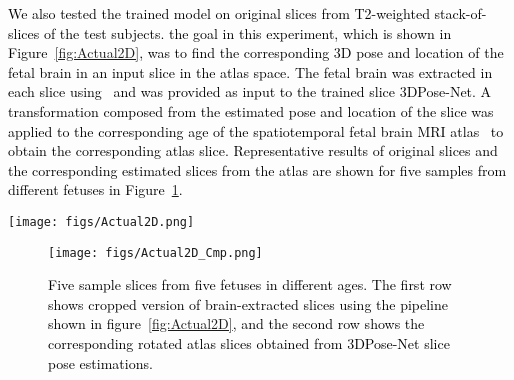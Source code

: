 \documentclass[journal,transmag]{IEEEtran}
\begin{document}
\textcolor{black}{We also tested the trained model on original slices from T2-weighted stack-of-slices of the test subjects. the goal in this experiment, which is shown in Figure~\ref{fig:Actual2D}, was to find the corresponding 3D pose and location of the fetal brain in an input slice in the atlas space. The fetal brain was extracted in each slice using~\cite{salehi2018real} and was provided as input to the trained slice 3DPose-Net. A transformation composed from the estimated pose and location of the slice was applied to the corresponding age of the spatiotemporal fetal brain MRI atlas~\cite{gholipour2017normative} to obtain the corresponding atlas slice. Representative results of original slices and the corresponding estimated slices from the atlas are shown for five samples from different fetuses in Figure~\ref{fig:Actual2D_cmp}.} 


\begin{figure*}
    \centering
    \texttt{[image: figs/Actual2D.png]}
    \caption{\textcolor{black}{The pipeline used to test the trained 3DPose-Net on original fetal MRI slices in the test set. The fetal brain was extracted using a previously published technique~\cite{salehi2018real}, and fed into 3DPose-Net. The transformation composed of the estimated slice pose and location was applied to the age-matched atlas to find the corresponding slice from the atlas.}}
    \label{fig:Actual2D}
\end{figure*}


\begin{figure}
    \centering
    \texttt{[image: figs/Actual2D\_Cmp.png]}
    \caption{\textcolor{black}{Five sample slices from five fetuses in different ages. The first row shows cropped version of brain-extracted slices using the pipeline shown in figure~\ref{fig:Actual2D}, and the second row shows the corresponding rotated atlas slices obtained from 3DPose-Net slice pose estimations.}}
    \label{fig:Actual2D_cmp}
\end{figure}
\end{document}
